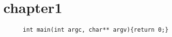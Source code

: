 \documentclass{book}
\begin{document}
\chapter{chapter1}
\begin{figure}
\begin{verbatim}
int main(int argc, char** argv){return 0;}
\end{verbatim}
\end{figure}
\end{document}
